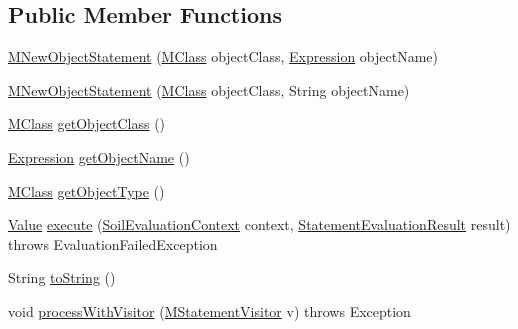 \subsection*{Public Member Functions}
\begin{DoxyCompactItemize}
\item 
\hyperlink{classorg_1_1tzi_1_1use_1_1uml_1_1sys_1_1soil_1_1_m_new_object_statement_aaf5566cd1959238ad7aaa1316cb104ee}{M\-New\-Object\-Statement} (\hyperlink{interfaceorg_1_1tzi_1_1use_1_1uml_1_1mm_1_1_m_class}{M\-Class} object\-Class, \hyperlink{classorg_1_1tzi_1_1use_1_1uml_1_1ocl_1_1expr_1_1_expression}{Expression} object\-Name)
\item 
\hyperlink{classorg_1_1tzi_1_1use_1_1uml_1_1sys_1_1soil_1_1_m_new_object_statement_aa12edc5686e5664472d6808f71ff1da6}{M\-New\-Object\-Statement} (\hyperlink{interfaceorg_1_1tzi_1_1use_1_1uml_1_1mm_1_1_m_class}{M\-Class} object\-Class, String object\-Name)
\item 
\hyperlink{interfaceorg_1_1tzi_1_1use_1_1uml_1_1mm_1_1_m_class}{M\-Class} \hyperlink{classorg_1_1tzi_1_1use_1_1uml_1_1sys_1_1soil_1_1_m_new_object_statement_a869cac94eefcad88bc482098ef675d92}{get\-Object\-Class} ()
\item 
\hyperlink{classorg_1_1tzi_1_1use_1_1uml_1_1ocl_1_1expr_1_1_expression}{Expression} \hyperlink{classorg_1_1tzi_1_1use_1_1uml_1_1sys_1_1soil_1_1_m_new_object_statement_a6d5b0590194b239b25b8bff91cdb98a2}{get\-Object\-Name} ()
\item 
\hyperlink{interfaceorg_1_1tzi_1_1use_1_1uml_1_1mm_1_1_m_class}{M\-Class} \hyperlink{classorg_1_1tzi_1_1use_1_1uml_1_1sys_1_1soil_1_1_m_new_object_statement_a240303143f46187f7032e885271d44bb}{get\-Object\-Type} ()
\item 
\hyperlink{classorg_1_1tzi_1_1use_1_1uml_1_1ocl_1_1value_1_1_value}{Value} \hyperlink{classorg_1_1tzi_1_1use_1_1uml_1_1sys_1_1soil_1_1_m_new_object_statement_ae88288a26cc32e592d5e75956fee382b}{execute} (\hyperlink{classorg_1_1tzi_1_1use_1_1uml_1_1sys_1_1soil_1_1_soil_evaluation_context}{Soil\-Evaluation\-Context} context, \hyperlink{classorg_1_1tzi_1_1use_1_1uml_1_1sys_1_1_statement_evaluation_result}{Statement\-Evaluation\-Result} result)  throws Evaluation\-Failed\-Exception 
\item 
String \hyperlink{classorg_1_1tzi_1_1use_1_1uml_1_1sys_1_1soil_1_1_m_new_object_statement_a640c77f532037d38a755043c0e28f075}{to\-String} ()
\item 
void \hyperlink{classorg_1_1tzi_1_1use_1_1uml_1_1sys_1_1soil_1_1_m_new_object_statement_ac5d95e97b2a03278486ac93649b388eb}{process\-With\-Visitor} (\hyperlink{interfaceorg_1_1tzi_1_1use_1_1uml_1_1sys_1_1soil_1_1_m_statement_visitor}{M\-Statement\-Visitor} v)  throws Exception 
\end{DoxyCompactItemize}
